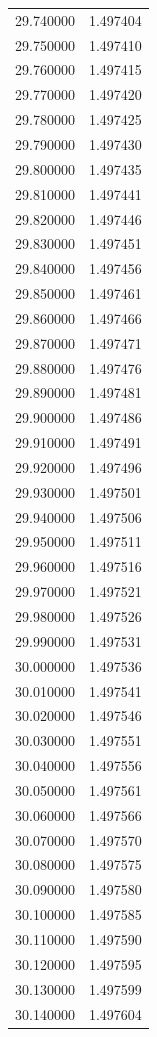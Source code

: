 \begin{tabular}{rr}
29.740000 & 1.497404 \\
29.750000 & 1.497410 \\
29.760000 & 1.497415 \\
29.770000 & 1.497420 \\
29.780000 & 1.497425 \\
29.790000 & 1.497430 \\
29.800000 & 1.497435 \\
29.810000 & 1.497441 \\
29.820000 & 1.497446 \\
29.830000 & 1.497451 \\
29.840000 & 1.497456 \\
29.850000 & 1.497461 \\
29.860000 & 1.497466 \\
29.870000 & 1.497471 \\
29.880000 & 1.497476 \\
29.890000 & 1.497481 \\
29.900000 & 1.497486 \\
29.910000 & 1.497491 \\
29.920000 & 1.497496 \\
29.930000 & 1.497501 \\
29.940000 & 1.497506 \\
29.950000 & 1.497511 \\
29.960000 & 1.497516 \\
29.970000 & 1.497521 \\
29.980000 & 1.497526 \\
29.990000 & 1.497531 \\
30.000000 & 1.497536 \\
30.010000 & 1.497541 \\
30.020000 & 1.497546 \\
30.030000 & 1.497551 \\
30.040000 & 1.497556 \\
30.050000 & 1.497561 \\
30.060000 & 1.497566 \\
30.070000 & 1.497570 \\
30.080000 & 1.497575 \\
30.090000 & 1.497580 \\
30.100000 & 1.497585 \\
30.110000 & 1.497590 \\
30.120000 & 1.497595 \\
30.130000 & 1.497599 \\
30.140000 & 1.497604 \\

\end{tabular}
